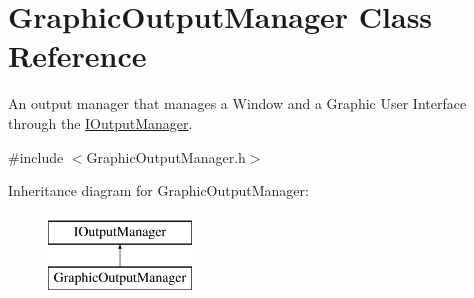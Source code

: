 \hypertarget{class_graphic_output_manager}{}\section{Graphic\+Output\+Manager Class Reference}
\label{class_graphic_output_manager}


An output manager that manages a Window and a Graphic User Interface through the \mbox{\hyperlink{class_i_output_manager}{I\+Output\+Manager}}.  




{\ttfamily \#include $<$Graphic\+Output\+Manager.\+h$>$}

Inheritance diagram for Graphic\+Output\+Manager\+:\begin{figure}[H]
\begin{center}
\leavevmode
\includegraphics[height=2.000000cm]{class_graphic_output_manager}
\end{center}
\end{figure}
